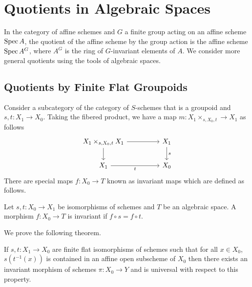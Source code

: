 \section{Quotients in Algebraic Spaces}\label{sec: quotients in algebraic spaces}
In the category of affine schemes and $G$ a finite group acting on an affine scheme $\operatorname{Spec} A$, the quotient of the affine scheme by the group action is the affine scheme $\operatorname{Spec} A^{G}$, where $A^{G}$ is the ring of $G$-invariant elements of $A$. We consider more general quotients using the tools of algebraic spaces. 

\subsection{Quotients by Finite Flat Groupoids}
Consider a subcategory of the category of $S$-schemes that is a groupoid and $s,t:X_{1}\to X_{0}$. Taking the fibered product, we have a map $m:X_{1}\times_{s,X_{0},t}\to X_{1}$ as follows
$$%
\begin{tikzcd}
	{X_{1}\times_{s,X_{0},t}X_{1}} && {X_{1}} \\
	{X_{1}} && {X_{0}}
	\arrow["s", from=1-3, to=2-3]
	\arrow["t"', from=2-1, to=2-3]
	\arrow[from=1-1, to=2-1]
	\arrow[from=1-1, to=1-3]
\end{tikzcd}$$
There are special maps $f:X_{0}\to T$ known as invariant maps which are defined as follows. 
\begin{definition}\label{def: invariant morphism}
    Let $s,t:X_{0}\to X_{1}$ be isomorphisms of schemes and $T$ be an algebraic space. A morphism $f:X_{0}\to T$ is invariant if $f\circ s=f\circ t$. 
\end{definition}
We prove the following theorem. 
\begin{theorem}\label{thm: invariant morphisms extending finite flat morphisms}
    If $s,t:X_{1}\to X_{0}$ are finite flat isomorphisms of schemes such that for all $x\in X_{0}$, $s(t^{-1}(x))$ is contained in an affine open subscheme of $X_{0}$ then there exists an invariant morphism of schemes $\pi:X_{0}\to Y$ and is universal with respect to this property. 
\end{theorem}
